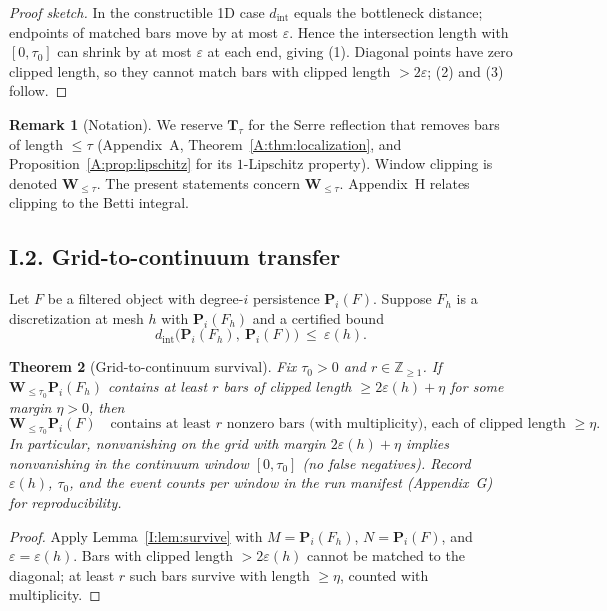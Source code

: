 \documentclass[11pt]{article}
\numberwithin{equation}{section}
\newtheorem{theorem}{Theorem}[section]
\theoremstyle{definition}
\newtheorem{remark}[theorem]{Remark}
\begin{document}
\begin{proof}[Proof sketch]
In the constructible 1D case \(d_{\mathrm{int}}\) equals the bottleneck distance; endpoints of matched bars move by at most \(\varepsilon\). Hence the intersection length with \([0,\tau_0]\) can shrink by at most \(\varepsilon\) at each end, giving (1). Diagonal points have zero clipped length, so they cannot match bars with clipped length \(>\!2\varepsilon\); (2) and (3) follow.
\end{proof}

\begin{remark}[Notation]\label{I:rk:notation}
We reserve \(\mathbf{T}_\tau\) for the Serre reflection that removes bars of length \(\le\tau\) (Appendix~A, Theorem~\ref{A:thm:localization}, and Proposition~\ref{A:prop:lipschitz} for its \(1\)-Lipschitz property). Window clipping is denoted \(\mathbf{W}_{\le\tau}\). The present statements concern \(\mathbf{W}_{\le\tau}\). Appendix~H relates clipping to the Betti integral.
\end{remark}

\subsection*{I.2. Grid-to-continuum transfer}
Let \(F\) be a filtered object with degree-\(i\) persistence \(\mathbf{P}_i(F)\).
Suppose \(F_h\) is a discretization at mesh \(h\) with \(\mathbf{P}_i(F_h)\) and a certified bound
\[
d_{\mathrm{int}}\bigl(\mathbf{P}_i(F_h),\ \mathbf{P}_i(F)\bigr)\ \le\ \varepsilon(h).
\]

\begin{theorem}[Grid-to-continuum survival]\label{I:thm:g2c}
Fix \(\tau_0>0\) and \(r\in\mathbb{Z}_{\ge 1}\).
If \(\mathbf{W}_{\le \tau_0}\mathbf{P}_i(F_h)\) contains at least \(r\) bars of clipped length \(\ge 2\varepsilon(h)+\eta\) for some margin \(\eta>0\), then
\[
\mathbf{W}_{\le \tau_0}\mathbf{P}_i(F)\quad\text{contains at least \(r\) nonzero bars (with multiplicity), each of clipped length }\ge \eta.
\]
In particular, nonvanishing on the grid with margin \(2\varepsilon(h)+\eta\) implies nonvanishing in the continuum window \([0,\tau_0]\) (no false negatives). Record \(\varepsilon(h)\), \(\tau_0\), and the event counts per window in the run manifest (Appendix~G) for reproducibility.
\end{theorem}

\begin{proof}
Apply Lemma~\ref{I:lem:survive} with \(M=\mathbf{P}_i(F_h)\), \(N=\mathbf{P}_i(F)\), and \(\varepsilon=\varepsilon(h)\). Bars with clipped length \(>\!2\varepsilon(h)\) cannot be matched to the diagonal; at least \(r\) such bars survive with length \(\ge\eta\), counted with multiplicity.
\end{proof}
\end{document}
